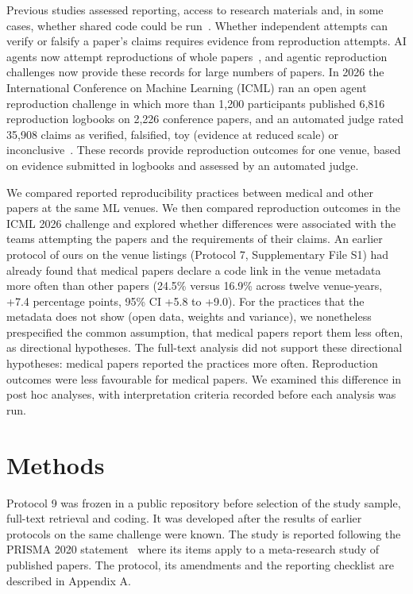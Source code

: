 \documentclass[11pt]{article}
\begin{document}
Previous studies assessed reporting, access to research materials and, in some cases, whether shared code could be run~\cite{r3,r4}. Whether independent attempts can verify or falsify a paper's claims requires evidence from reproduction attempts. AI agents now attempt reproductions of whole papers~\cite{r8}, and agentic reproduction challenges now provide these records for large numbers of papers. In 2026 the International Conference on Machine Learning (ICML) ran an open agent reproduction challenge in which more than 1,200 participants published 6,816 reproduction logbooks on 2,226 conference papers, and an automated judge rated 35,908 claims as verified, falsified, toy (evidence at reduced scale) or inconclusive~\cite{r9}. These records provide reproduction outcomes for one venue, based on evidence submitted in logbooks and assessed by an automated judge.

We compared reported reproducibility practices between medical and other papers at the same ML venues. We then compared reproduction outcomes in the ICML 2026 challenge and explored whether differences were associated with the teams attempting the papers and the requirements of their claims. An earlier protocol of ours on the venue listings (Protocol 7, Supplementary File S1) had already found that medical papers declare a code link in the venue metadata more often than other papers (24.5\% versus 16.9\% across twelve venue-years, +7.4 percentage points, 95\% CI +5.8 to +9.0). For the practices that the metadata does not show (open data, weights and variance), we nonetheless prespecified the common assumption, that medical papers report them less often, as directional hypotheses. The full-text analysis did not support these directional hypotheses: medical papers reported the practices more often. Reproduction outcomes were less favourable for medical papers. We examined this difference in post hoc analyses, with interpretation criteria recorded before each analysis was run.

\section*{Methods}
Protocol 9 was frozen in a public repository before selection of the study sample, full-text retrieval and coding. It was developed after the results of earlier protocols on the same challenge were known. The study is reported following the PRISMA 2020 statement~\cite{r10} where its items apply to a meta-research study of published papers. The protocol, its amendments and the reporting checklist are described in Appendix A.
\end{document}
